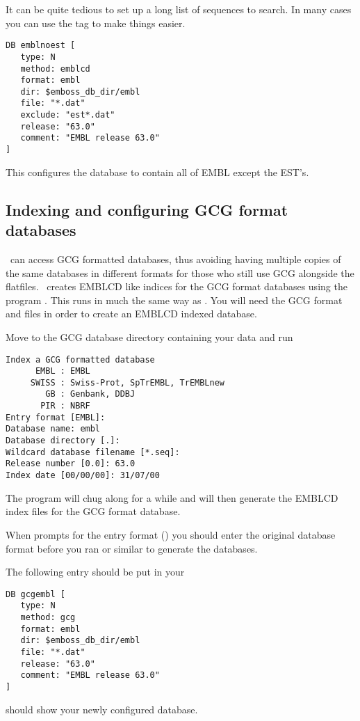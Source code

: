 \documentclass{report}
\begin{document}
It can be quite tedious to set up a long list of sequences to search. In many cases you can use the  tag to make things easier.
\begin{verbatim}
DB emblnoest [
   type: N
   method: emblcd
   format: embl
   dir: $emboss_db_dir/embl
   file: "*.dat"
   exclude: "est*.dat"
   release: "63.0"
   comment: "EMBL release 63.0"
]
\end{verbatim}
This configures the  database to contain all of EMBL except the EST's.

\subsection{Indexing and configuring GCG format databases}

\EMBOSS\ can access GCG formatted databases, thus avoiding having multiple copies of the same databases in different formats for those who still use GCG alongside the flatfiles. 
\EMBOSS\ creates EMBLCD like indices for the GCG format databases using the program . 
This runs in much the same way as . You will need the GCG format  and  files in order to create an EMBLCD indexed database.

Move to the GCG database directory containing your data and run 
\begin{verbatim}
Index a GCG formatted database
      EMBL : EMBL
     SWISS : Swiss-Prot, SpTrEMBL, TrEMBLnew
        GB : Genbank, DDBJ
       PIR : NBRF
Entry format [EMBL]: 
Database name: embl
Database directory [.]: 
Wildcard database filename [*.seq]: 
Release number [0.0]: 63.0
Index date [00/00/00]: 31/07/00
\end{verbatim}
The program will chug along for a while and will then generate the EMBLCD index files for the GCG format database.

When  prompts for the entry format () you should enter the original database format before you ran  or similar to generate the  databases.

The following entry should be put in your 
\begin{verbatim}
DB gcgembl [
   type: N
   method: gcg
   format: embl
   dir: $emboss_db_dir/embl
   file: "*.dat"
   release: "63.0"
   comment: "EMBL release 63.0"
]
\end{verbatim}
 should show your newly configured database.
\end{document}
